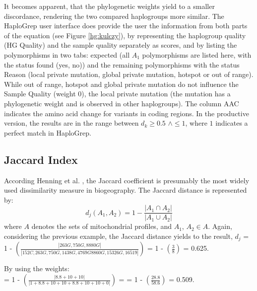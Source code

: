 It becomes apparent, that the phylogenetic weights yield to a smaller discordance, rendering the two compared haplogroups more similar. The HaploGrep user interface does provide the user the information from both parts of the equation (see Figure \ref{hg:kulczy}), by representing the haplogroup quality (HG Quality) and the sample quality separately as scores, and by listing the polymorphisms in two tabs: expected (all $A_1$ polymorphisms are listed here, with the status found (yes, no)) and the remaining polymorphisms with the status Reason (local private mutation, global private mutation, hotspot or out of range). While out of range, hotspot and global private mutation do not influence the Sample Quality (weight 0), the local private mutation (the mutation has a phylogenetic weight and is observed in other haplogroups). The column AAC indicates the amino acid change for variants in coding regions.  
In the productive version, the results are in the range between $d_k \geq 0.5 $ $ \wedge \leq 1$, where $1$ indicates a perfect match in HaploGrep.

\subsection{Jaccard Index}
According Henning et al. \cite{Hennig2006}, the Jaccard coefficient \cite{Jaccard1901} is presumably the most widely used dissimilarity measure in biogeography. The Jaccard distance is represented by:
\begin{equation}
d_j (A_1, A_2) = 1 -  \frac{\left|A_1  \cap A_2\right| }{\left|A_1 \cup A_2\right|} 
\end{equation}
where $A$ denotes the sets of mitochondrial profiles, and $A_1$, $A_2 \in A$. Again, considering the previous example, the Jaccard distance yields to the result, $d_j$ =
1 - $\left(  \frac{\left| 263G, 750G, 8880G \right|}{\left| 152C, 263G, 750G, 1438G, 4769G 8860G,15326G, 16519 \right|}  \right)$  = 
1 -  $\left(  \frac{3}{8} \right)$ = 0.625. 

By using the weights: \\
= 1 - $\left(  \frac{\left| 8.8 + 10 + 10 \right|}{\left| 1 + 8.8 + 10 + 10 + 8.8 + 10 + 10  + 0 \right|}  \right)$  = 
= 1 -  $\left(  \frac{28.8}{58.6} \right)$ = 0.509. 
